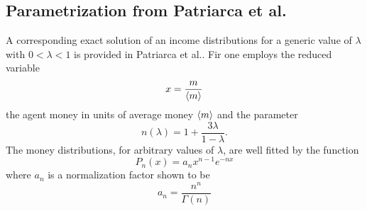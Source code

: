 \documentclass[10pt, a4paper]{amsart}
\begin{document}
\begin{appendices}

\section{Parametrization from Patriarca et al.}
\label{app:partriarca}
A corresponding exact solution of an income distributions for a generic value of $\lambda$ with $0<\lambda<1$ is provided in Patriarca et al.\cite{Patriarca}. Fir one employs the reduced variable
\begin{equation}
x = \frac{m}{\ev{m}}
\end{equation}
the agent money in units of average money $\ev{m}$ and the parameter
\begin{equation}
n(\lambda) = 1 + \frac{3\lambda}{1-\lambda}.
\end{equation}
The money distributions, for arbitrary values of $\lambda$, are well fitted by the function
\begin{equation}
P_n(x) = a_nx^{n-1}e^{-nx}
\end{equation}
where $a_n$ is a normalization factor shown to be
\begin{equation}
a_n = \frac{n^n}{\Gamma(n)}
\end{equation}
\end{appendices}
\end{document}
